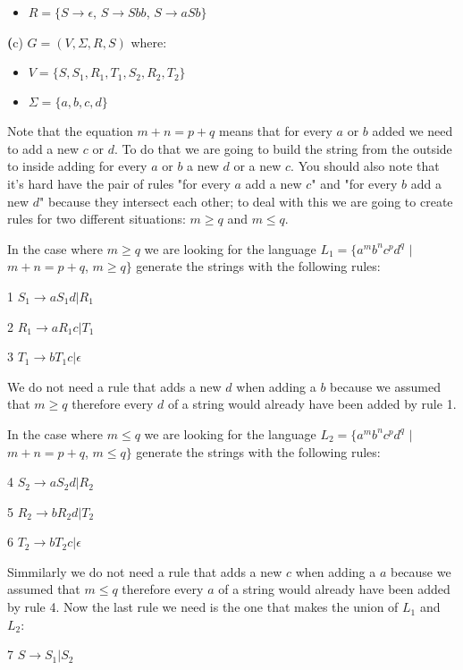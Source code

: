 \documentclass[11pt]{article}
\renewcommand{\part}[1] {{\vspace{0.15in}\noindent\textbf (#1)} \vspace{0.10in}}
\begin{document}
\begin{itemize}    
    \item{$R = \{S \rightarrow \epsilon$, $S \rightarrow Sbb$, $S \rightarrow aSb\}$}
\end{itemize}


\part{c} $G = (V, \Sigma, R, S)$ where:

\begin{itemize}
    \item{$V = \{S, S_1, R_1, T_1, S_2, R_2, T_2\}$}
    \item{$\Sigma = \{a, b, c, d\}$}
\end{itemize}
    
\par Note that the equation $m + n = p + q$ means that for every $a$ or $b$ added we need to add a new $c$ or $d$. To do that we are going to build the string from the outside to inside adding for every $a$ or $b$ a new $d$ or a new $c$. You should also note that it's hard have the pair of rules "for every $a$ add a new $c$" and "for every $b$ add a new $d$" because they intersect each other; to deal with this we are going to create rules for two different situations: $m \geq q$ and $m \leq q$.
\par In the case where $m \geq q$ we are looking for the language $L_1 = \{a^mb^nc^pd^q$ $|$ $m + n = p + q$, $m \geq q\} $ generate the strings with the following rules:
\par 1 $S_1 \rightarrow aS_1d | R_1$
\par 2 $R_1 \rightarrow aR_1c | T_1$
\par 3 $T_1 \rightarrow bT_1c | \epsilon$
\par We do not need a rule that adds a new $d$ when adding a $b$ because we assumed that $m \geq q$ therefore every $d$ of a string would already have been added by rule 1.
\par In the case where $m \leq q$ we are looking for the language $L_2 = \{a^mb^nc^pd^q$ $|$ $m + n = p + q$, $m \leq q\} $ generate the strings with the following rules:
\par 4 $S_2 \rightarrow aS_2d | R_2$
\par 5 $R_2 \rightarrow bR_2d | T_2$
\par 6 $T_2 \rightarrow bT_2c | \epsilon$
\par Simmilarly we do not need a rule that adds a new $c$ when adding a $a$ because we assumed that $m \leq q$ therefore every $a$ of a string would already have been added by rule 4.
    Now the last rule we need is the one that makes the union of $L_1$ and $L_2$: 
\par 7 $S \rightarrow S_1 | S_2$
\end{document}
